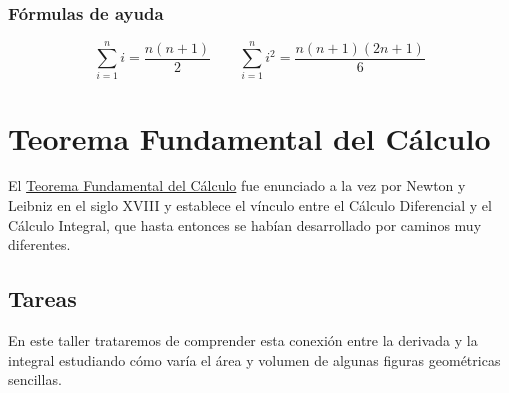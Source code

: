 \documentclass[
  a4paper,
]{scrreport}
\begin{document}
\hypertarget{fuxf3rmulas-de-ayuda}{%
\subsection{Fórmulas de ayuda}\label{fuxf3rmulas-de-ayuda}}

\[
\sum_{i=1}^n i = \dfrac{n(n+1)}{2}\qquad \sum_{i=1}^n i^2 = \dfrac{n(n+1)(2n+1)}{6}
\]


\hypertarget{teorema-fundamental-del-cuxe1lculo}{%
\chapter{Teorema Fundamental del
Cálculo}\label{teorema-fundamental-del-cuxe1lculo}}

El
\href{https://aprendeconalf.es/analisis-manual/09-integrales.html\#thm-teorema-fundamental-calculo-1}{Teorema
Fundamental del Cálculo} fue enunciado a la vez por Newton y Leibniz en
el siglo XVIII y establece el vínculo entre el Cálculo Diferencial y el
Cálculo Integral, que hasta entonces se habían desarrollado por caminos
muy diferentes.

\hypertarget{tareas-2}{%
\section{Tareas}\label{tareas-2}}

En este taller trataremos de comprender esta conexión entre la derivada
y la integral estudiando cómo varía el área y volumen de algunas figuras
geométricas sencillas.
\end{document}
